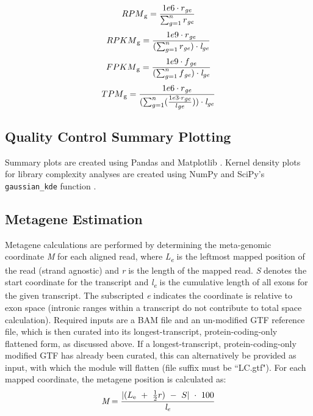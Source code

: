 \documentclass[10pt, oneside]{article}
\begin{document}
  \begin{equation}
    RPM\textsubscript{g} = \frac{1e6 \cdot r\textsubscript{\textit{ge}}}{\sum_{g=1}^{n} r\textsubscript{\textit{ge}}}
  \end{equation}
  \begin{equation}
    RPKM\textsubscript{g} = \frac{1e9 \cdot r\textsubscript{\textit{ge}}}{(\sum_{g=1}^{n} r\textsubscript{\textit{ge}}) \cdot \textit{l} \textsubscript{\textit{ge}}}
  \end{equation}
  \begin{equation}
    FPKM\textsubscript{g} = \frac{1e9 \cdot f\textsubscript{\textit{ge}}}{(\sum_{g=1}^{n} f\textsubscript{\textit{ge}}) \cdot \textit{l} \textsubscript{\textit{ge}}}
  \end{equation}
  \begin{equation}
    TPM\textsubscript{g} = \frac{1e6 \cdot r\textsubscript{\textit{ge}}}{(\sum_{g=1}^{n} (\frac{1e3 \cdot r\textsubscript{\textit{ge}}}{l\textsubscript{\textit{ge}}})) \cdot \textit{l} \textsubscript{\textit{ge}}}
  \end{equation}


\subsection{Quality Control Summary Plotting}
Summary plots are created using Pandas \cite{pandas} and Matplotlib \cite{matplotlib}. Kernel density plots for library complexity analyses are created using NumPy \cite{numpy1, numpy2} and SciPy's \texttt{gaussian\_kde} function \cite{scipy}.

\subsection{Metagene Estimation}
Metagene calculations are performed by determining the meta-genomic coordinate \textit{M} for each aligned read, where \textit{L\textsubscript{e}} is the leftmost mapped position of the read (strand agnostic) and \textit{r} is the length of the mapped read. \textit{S} denotes the start coordinate for the transcript and \textit{l\textsubscript{e}} is the cumulative length of all exons for the given transcript. The subscripted \textit{e} indicates the coordinate is relative to exon space (intronic ranges within a transcript do not contribute to total space calculation). Required inputs are a BAM file and an un-modified GTF reference file, which is then curated into its longest-transcript, protein-coding-only flattened form, as discussed above. If a longest-transcript, protein-coding-only modified GTF has already been curated, this can alternatively be provided as input, with which the module will flatten (file suffix must be ``LC.gtf"). For each mapped coordinate, the metagene position is calculated as:
\begin{equation}
\textit{M} = \frac{|(L\textsubscript{e}\ +\ \frac{1}{2}r)\ -\ S|\ \cdot\ 100}{\textit{l\textsubscript{e}}}
\end{equation}
\end{document}
